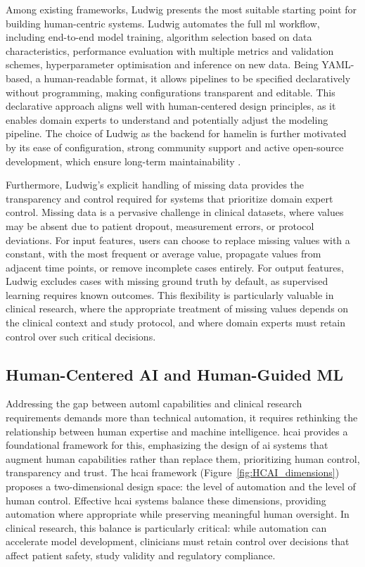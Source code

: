 \documentclass[conference,twocolumn]{IEEEtran}
\begin{document}
Among existing frameworks, Ludwig \cite{ludwig} presents the most suitable starting   
point for building human-centric systems. Ludwig automates the full \gls{ml}   
workflow, including end-to-end model training, algorithm selection based on data   
characteristics, performance evaluation with multiple metrics and validation schemes, hyperparameter optimisation and inference on new data. Being YAML-based, a   
human-readable format, it allows pipelines to be specified declaratively without   
programming, making configurations transparent and editable. This declarative   
approach aligns well with human-centered design principles, as it enables domain experts to understand and potentially adjust the modeling pipeline. The choice of Ludwig as the backend for \gls{hamelin} is further motivated by its ease of configuration, strong community support and active open-source development, which ensure long-term maintainability \cite{palazuelos2024non}.  
  
Furthermore, Ludwig's explicit handling of missing data provides the transparency   
and control required for systems that prioritize domain expert control. Missing data is a pervasive challenge in clinical datasets, where values may be absent due to patient dropout, measurement errors, or protocol deviations. For input features, users can choose to replace missing values with a constant, with the most frequent or average value, propagate values from adjacent time points, or remove incomplete cases entirely. For output features, Ludwig excludes cases with missing ground truth by default, as supervised learning requires known outcomes. This flexibility is particularly valuable in clinical research, where the appropriate treatment of missing values depends on the clinical context and study protocol, and where domain experts must retain control over such critical decisions.
  
\subsection{Human-Centered AI and Human-Guided ML}  
\label{subsec:hcai_hgml}  
  
Addressing the gap between \gls{automl} capabilities and clinical research   
requirements demands more than technical automation, it requires rethinking the   
relationship between human expertise and machine intelligence. \Gls{hcai}   
\cite{shneiderman2022human} provides a foundational framework for this, emphasizing   
the design of \gls{ai} systems that augment human capabilities rather than replace   
them, prioritizing human control, transparency and trust. The \gls{hcai} framework   
(Figure~\ref{fig:HCAI_dimensions}) proposes a two-dimensional design space: the   
level of automation and the level of human control. Effective \gls{hcai} systems   
balance these dimensions, providing automation where appropriate while preserving   
meaningful human oversight. In clinical research, this balance is particularly   
critical: while automation can accelerate model development, clinicians must retain   
control over decisions that affect patient safety, study validity and regulatory   
compliance.
\end{document}
